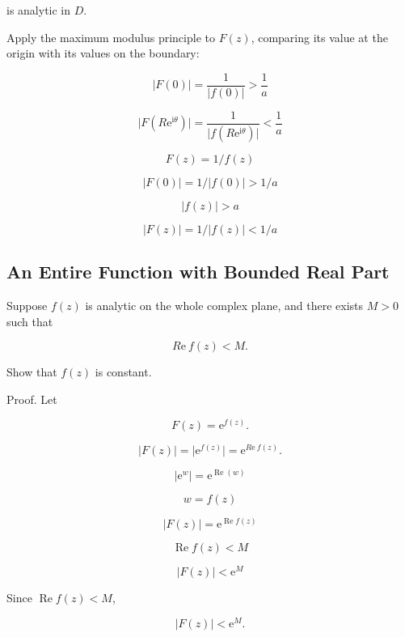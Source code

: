 \documentclass[11pt,a4paper]{article}
\theoremstyle{definition}
\theoremstyle{plain}
\begin{document}
is analytic in $D$.

Apply the maximum modulus principle to $F(z)$, comparing its value at the origin with its values on the boundary:

\begin{equation}
\vert{}F(0)\vert{} = \frac{1}{\vert{}f(0)\vert{}} > \frac{1}{a}
\end{equation}

\[
\vert{}F(R\mathrm{e}^{\mathrm{i}\theta})\vert{} = \frac{1}{\vert{}f(R\mathrm{e}^{\mathrm{i}\theta})\vert{}} < \frac{1}{a}
\]

\[
F(z) = 1/f(z)
\]

\[
\vert{}F(0)\vert{} = 1/\vert{}f(0)\vert{} > 1/a
\]

\[
\vert{}f(z)\vert{} > a
\]

\[
\vert{}F(z)\vert{} = 1/\vert{}f(z)\vert{} < 1/a
\]

\subsection{An Entire Function with Bounded Real Part}

Suppose $f(z)$ is analytic on the whole complex plane, and there exists $M > 0$ such that

\begin{equation}
R\mathrm{e}\ f(z) < M.
\end{equation}

Show that $f(z)$ is constant.

Proof. Let

\begin{equation}
F(z) = \mathrm{e}^{f(z)}.
\end{equation}

\[
\vert{}F(z)\vert{} = \vert{}\mathrm{e}^{f(z)}\vert{} = \mathrm{e}^{R\mathrm{e}\ f(z)}.
\]

\[
\vert{}\mathrm{e}^{w}\vert{} = \mathrm{e}^{\operatorname{Re}(w)}
\]

\[
w = f(z)
\]

\[
\vert{}F(z)\vert{} = \mathrm{e}^{\operatorname{Re}f(z)}
\]

\[
\operatorname{Re}f(z) < M
\]

\[
\vert{}F(z)\vert{} < \mathrm{e}^{M}
\]

Since $\operatorname{Re}f(z) < M$,

\begin{equation}
\vert{}F(z)\vert{} < \mathrm{e}^{M}.
\end{equation}
\end{document}
